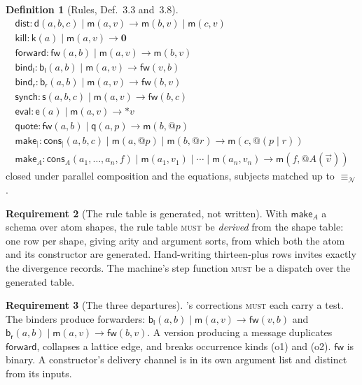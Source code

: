 \documentclass[11pt,a4paper]{article}
\makeatletter
\newcommand{\MUST}{\textsc{must}}
\newcommand{\quo}[1]{@#1}
\newcommand{\drp}[1]{{*}#1}
\newcommand{\nil}{\mathbf{0}}
\newcommand{\nequiv}{\equiv_{\mathcal{N}}}
\newcommand{\mm}{\mathsf{m}}
\newcommand{\dd}{\mathsf{d}}
\newcommand{\kk}{\mathsf{k}}
\newcommand{\fw}{\mathsf{fw}}
\newcommand{\bl}{\mathsf{b}_{\mathsf{l}}}
\newcommand{\br}{\mathsf{b}_{\mathsf{r}}}
\newcommand{\sy}{\mathsf{s}}
\newcommand{\ev}{\mathsf{e}}
\newcommand{\qq}{\mathsf{q}}
\newcommand{\cons}{\mathsf{cons}}
\newcommand{\red}{\longrightarrow}
\theoremstyle{definition}
\newtheorem{definition}{Definition}[section]
\newtheorem{requirement}[definition]{Requirement}
\theoremstyle{plain}
\makeatother
\begin{document}
\begin{definition}[Rules, \cite{draft3} Def.~3.3 and~3.8]\label{def:tred}
\[
\begin{array}{l}
 \mathsf{dist} : \dd(a,b,c) \mid \mm(a,v) \red \mm(b,v) \mid \mm(c,v)\\
 \mathsf{kill} : \kk(a) \mid \mm(a,v) \red \nil\\
 \mathsf{forward} : \fw(a,b) \mid \mm(a,v) \red \mm(b,v)\\
 \mathsf{bind}_{\mathsf{l}} : \bl(a,b) \mid \mm(a,v) \red \fw(v,b)\\
 \mathsf{bind}_{\mathsf{r}} : \br(a,b) \mid \mm(a,v) \red \fw(b,v)\\
 \mathsf{synch} : \sy(a,b,c) \mid \mm(a,v) \red \fw(b,c)\\
 \mathsf{eval} : \ev(a) \mid \mm(a,v) \red \drp{v}\\
 \mathsf{quote} : \fw(a,b) \mid \qq(a,p) \red \mm(b,\quo{p})\\
 \mathsf{make}_{\mid} : \cons_{\mid}(a,b,c) \mid \mm(a,\quo{p}) \mid
   \mm(b,\quo{r}) \red \mm(c,\quo{(p \mid r)})\\
 \mathsf{make}_{A} : \cons_{A}(a_{1},\dots,a_{n},f) \mid \mm(a_{1},v_{1})
   \mid \cdots \mid \mm(a_{n},v_{n}) \red \mm(f,\quo{A(\vec v)})
\end{array}
\]
closed under parallel composition and the equations, subjects matched up to
$\nequiv$.
\end{definition}

\begin{requirement}[The rule table is generated, not written]\label{req:rules}
With $\mathsf{make}_{A}$ a schema over atom shapes, the rule table \MUST{} be
\emph{derived} from the shape table: one row per shape, giving arity and
argument sorts, from which both the atom and its constructor are generated.
Hand-writing thirteen-plus rows invites exactly the divergence
\cite[Rem.~3.4]{draft3} records. The machine's step function \MUST{} be a
dispatch over the generated table.
\end{requirement}

\begin{requirement}[The three departures]\label{req:departures}
\cite[Rem.~3.4]{draft3}'s corrections \MUST{} each carry a test. The binders
produce forwarders: $\bl(a,b) \mid \mm(a,v) \red \fw(v,b)$ and
$\br(a,b) \mid \mm(a,v) \red \fw(b,v)$. A version producing a message
duplicates $\mathsf{forward}$, collapses a lattice edge, and breaks
occurrence kinds (o1) and (o2). $\fw$ is binary. A constructor's delivery
channel is in its own argument list and distinct from its inputs.
\end{requirement}
\end{document}
